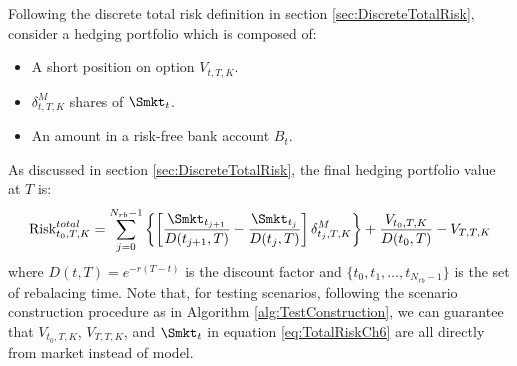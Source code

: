 Following the discrete total risk definition in section \ref{sec:DiscreteTotalRisk}, consider a hedging portfolio  which is composed of:
\begin{itemize}
	\item A short position on option $V_{t,T,K}$.
	\item $\delta^{M}_{t,T,K}$ shares of $\Smkt_t$. 
	\item An amount in a risk-free bank account $B_t$.
\end{itemize}
 As discussed in section \ref{sec:DiscreteTotalRisk}, the final hedging portfolio value at $T$ is:
 \begin{equation}
	\text{Risk}^{total}_{t_0,T,K}=\sum_{j=0}^{N_{rb}-1}\left\{ \left[\frac{\Smkt_{t_{j+1}}}{D(t_{j+1},T)}-\frac{\Smkt_{t_{j}}}{D(t_{j},T)}\right] \delta^M_{t_j,T,K} \right\}+\frac{V_{t_0,T,K}}{D(t_{0},T)}-V_{T,T,K}
	\label{eq:TotalRiskCh6}
\end{equation}
where
$D(t,T)=e^{-r(T-t)}$ is the discount factor and $\{t_0,t_1, \dots, t_{N_{rb}-1}\}$ is the set of rebalacing time. Note that, for testing scenarios, following the scenario construction procedure as in Algorithm \ref{alg:TestConstruction}, we can guarantee that $V_{t_0,T,K}$, $V_{T,T,K}$, and $\Smkt_t$ in equation \eqref{eq:TotalRiskCh6} are all directly from market instead of model.

